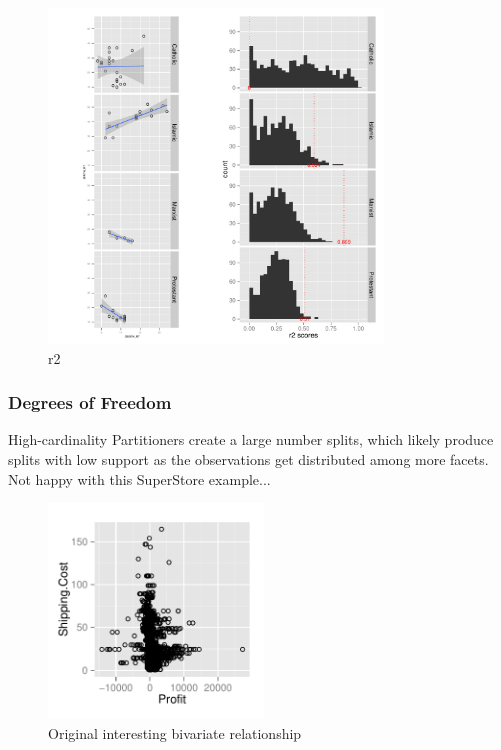\begin{figure}
\raggedleft
\includegraphics[width=3.5in,height=3.5in]{images/4_16075880239701-LEADER.pdf}
  \caption{r2}
 \label{fig:r2-leader}
\end{figure}

\subsubsection{Degrees of Freedom}
High-cardinality Partitioners create a large number splits, which likely produce splits with low support as the observations get distributed among more facets. Not happy with this SuperStore example...
\begin{figure}
 \centering 
\includegraphics[width=2.25in,height=2.25in]{images/Profit-Shipping_Cost.pdf}
  \caption{Original interesting bivariate relationship}
 \label{fig:original3}
\end{figure}

